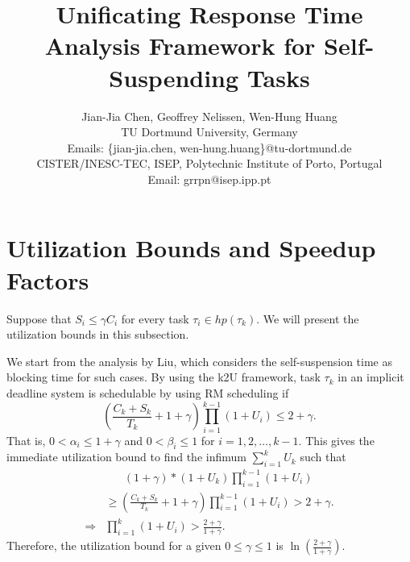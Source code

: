 \documentclass[10pt,conference,preprint]{IEEEtran}
\begin{document}
  
\title{Unificating Response Time Analysis Framework for Self-Suspending Tasks}

\author{Jian-Jia Chen, Geoffrey Nelissen, Wen-Hung Huang\\
 TU Dortmund University, Germany\\
Emails: \{jian-jia.chen, wen-hung.huang\}@tu-dortmund.de\\
 CISTER/INESC-TEC, ISEP, Polytechnic Institute of Porto, Portugal \\
Email: grrpn@isep.ipp.pt
}

\maketitle

\begin{abstract}
  
\end{abstract}























\section{Utilization Bounds and Speedup Factors}
Suppose that $S_i \leq \gamma C_i$ for every task $\tau_i \in hp(\tau_k)$. We will present the utilization bounds in this subsection. 

We start from the analysis by Liu, which considers the self-suspension time as blocking time for such cases.
By using the k2U framework, task $\tau_k$ in an implicit deadline system is schedulable by using RM scheduling if
\[
(\frac{C_k + S_k}{ T_k}+1+\gamma) \prod_{i=1}^{k-1}(1+U_i) \leq 2+\gamma.
\]
That is, $0 < \alpha_i \leq  1+\gamma$ and $0 < \beta_i \leq 1$ for $i=1,2,\ldots,k-1$.
This gives the immediate utilization bound to find the infimum $\sum_{i=1}^{k} U_k$ such that
\begin{align*}
&\;\;\;\;\;\; (1+\gamma)*(1+U_k) \prod_{i=1}^{k-1}(1+U_i) \\
&\geq (\frac{C_k + S_k}{ T_k}+1+\gamma) \prod_{i=1}^{k-1}(1+U_i) > 2+\gamma.\\
\Rightarrow & \prod_{i=1}^{k}(1+U_i) > \frac{2+\gamma}{1+\gamma}.
\end{align*}
Therefore, the utilization bound for a given $0 \leq \gamma \leq 1$  is $\ln(\frac{2+\gamma}{1+\gamma})$.
\end{document}
